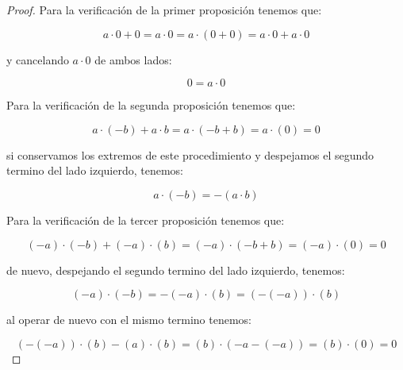         \begin{proof}
            Para la verificación de la primer proposición tenemos que:

            \begin{equation*}
                a \cdot 0 + 0 = a \cdot 0 = a \cdot (0 + 0) = a \cdot 0  + a \cdot 0
            \end{equation*}

            y cancelando $a \cdot 0$ de ambos lados:

            \begin{equation*}
                0 = a \cdot 0
            \end{equation*}

            Para la verificación de la segunda proposición tenemos que:

            \begin{equation*}
                a \cdot (-b) + a \cdot b = a \cdot (-b + b) = a \cdot (0) = 0
            \end{equation*}

            si conservamos los extremos de este procedimiento y despejamos el segundo termino del lado izquierdo, tenemos:

            \begin{equation*}
                a \cdot (-b) = - (a \cdot b)
            \end{equation*}

            Para la verificación de la tercer proposición tenemos que:

            \begin{equation*}
                (-a) \cdot (-b) + (-a) \cdot (b) = (-a) \cdot (-b + b) = (-a) \cdot (0) = 0
            \end{equation*}

            de nuevo, despejando el segundo termino del lado izquierdo, tenemos:

            \begin{equation*}
                (-a) \cdot (-b) = -(-a) \cdot (b) = (-(-a)) \cdot (b)
            \end{equation*}

            al operar de nuevo con el mismo termino tenemos:

            \begin{equation*}
                (-(-a)) \cdot (b) - (a) \cdot (b) = (b) \cdot (-a - (-a)) = (b) \cdot (0) = 0
            \end{equation*}


\end{proof}
